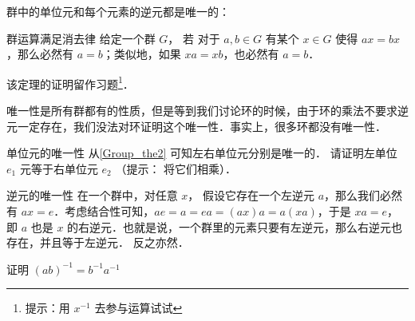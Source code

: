 群中的单位元和每个元素的逆元都是唯一的：

\begin{theorem}{群运算满足消去律}\label{Group_the2}
给定一个群 $G$， 若 对于 $ a, b\in G$ 有某个 $x\in G$ 使得 $ax=bx$，那么必然有 $a=b$；类似地，如果 $xa=xb$，也必然有 $a=b$．
\end{theorem}

该定理的证明留作习题\footnote{提示：用 $x^{-1}$ 去参与运算试试}．

唯一性是所有群都有的性质，但是等到我们讨论环的时候，由于环的乘法不要求逆元一定存在，我们没法对环证明这个唯一性．事实上，很多环都没有唯一性．

\begin{exercise}{单位元的唯一性}
从\autoref{Group_the2} 可知左右单位元分别是唯一的． 请证明左单位 $e_1$ 元等于右单位元 $e_2$ （提示： 将它们相乘）．
\end{exercise}

\begin{theorem}{逆元的唯一性}\label{Group_the1}
在一个群中，对任意 $x$， 假设它存在一个左逆元 $a$，那么我们必然有 $ax=e$．考虑结合性可知，$ae=a=ea=(ax)a=a(xa)$，于是 $xa=e$，即 $a$ 也是 $x$ 的右逆元．也就是说，一个群里的元素只要有左逆元，那么右逆元也存在，并且等于左逆元． 反之亦然．
\end{theorem}

\begin{exercise}{}
证明 $(ab)^{-1} = b^{-1}a^{-1}$
\end{exercise}
